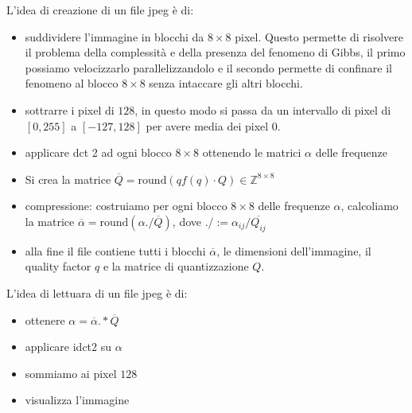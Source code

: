 L'idea di creazione di un file jpeg è di:
\begin{itemize}
    \item suddividere l'immagine in blocchi da $8\times 8$ pixel. Questo permette 
    di risolvere il problema della complessità e della presenza del fenomeno di 
    Gibbs, il primo 
    possiamo velocizzarlo parallelizzandolo e il secondo permette di confinare 
    il fenomeno al blocco $8\times 8$ senza intaccare gli altri blocchi. 
    \item sottrarre i pixel di $128$, in questo modo si passa da un intervallo di 
    pixel di $[0, 255]$ a $[-127,128]$ per avere media dei pixel $0$.
    \item applicare dct 2 ad ogni blocco $8\times 8$ ottenendo le matrici $\alpha$ delle frequenze
    \item Si crea la matrice $\overline{Q} = \text{round} (qf(q)\cdot Q)\in \mathbb{Z}^{8\times 8}$
    \item compressione: costruiamo per ogni blocco $8\times 8$ delle frequenze 
    $\alpha$, calcoliamo la matrice $\overline{\alpha} = \text{round}(\alpha./\overline{Q} )$,
    dove $./:= \alpha_{ij} / \overline{Q_{ij}}$ 
    \item alla fine il file contiene tutti i blocchi $\overline{\alpha}$, le dimensioni 
    dell'immagine, il quality factor $q$ e la matrice di quantizzazione $Q$.  
\end{itemize}

L'idea di lettuara di un file jpeg è di:
\begin{itemize}
    \item ottenere $\alpha = \overline{\alpha}.*\overline{Q}$
    \item applicare idct2 su $\alpha$
    \item sommiamo ai pixel $128$
    \item visualizza l'immagine
\end{itemize}